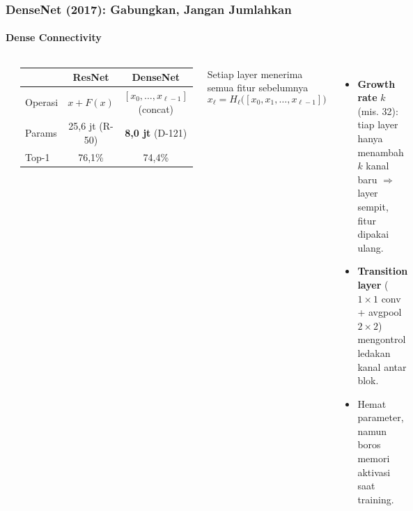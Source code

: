 \documentclass[t,aspectratio=169,xcolor=dvipsnames]{beamer}
\begin{document}
\begin{frame}
    \frametitle{DenseNet (2017): Gabungkan, Jangan Jumlahkan}
    \framesubtitle{Dense Connectivity}
    \footnotesize

    \begin{columns}[T]
        \begin{center}
        \end{center}
        \vspace{0.2cm}
        \begin{center}
        \setlength{\tabcolsep}{4pt}
        \begin{tabular}{lcc}
            \toprule
             & \textbf{ResNet} & \textbf{DenseNet} \\
            \midrule
            Operasi & $x + F(x)$ & $[x_0,\dots,x_{\ell-1}]$ (concat) \\
            Params & 25,6 jt (R-50) & \textbf{8,0 jt} (D-121) \\
            Top-1 & 76,1\% & 74,4\% \\
            \bottomrule
        \end{tabular}
        \end{center}

        \begin{block}{Setiap layer menerima semua fitur sebelumnya}
            $$x_\ell = H_\ell\big([x_0, x_1, \dots, x_{\ell-1}]\big)$$
        \end{block}
        \begin{itemize}
            \item \textbf{Growth rate} $k$ (mis. 32): tiap layer hanya menambah $k$ kanal baru $\Rightarrow$ layer sempit, fitur dipakai ulang.
            \item \textbf{Transition layer} ($1\times1$ conv + avgpool $2\times2$) mengontrol ledakan kanal antar blok.
            \item Hemat parameter, namun boros memori aktivasi saat training.
        \end{itemize}
    \end{columns}
\end{frame}
\end{document}
